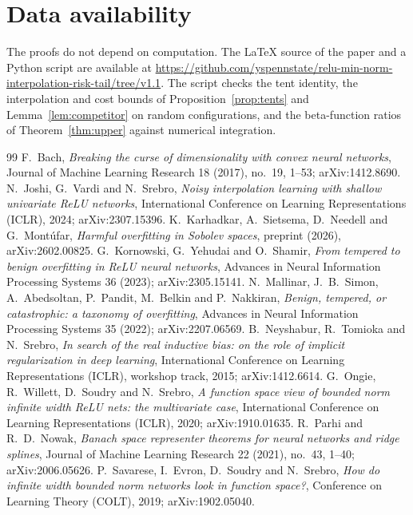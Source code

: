 \documentclass[11pt]{amsart}
\theoremstyle{remark}
\numberwithin{equation}{section}
\begin{document}
\section*{Data availability}
The proofs do not depend on computation. The \LaTeX{} source of the paper and a Python script are available at \url{https://github.com/yspennstate/relu-min-norm-interpolation-risk-tail/tree/v1.1}. The script checks the tent identity, the interpolation and cost bounds of Proposition~\ref{prop:tents} and Lemma~\ref{lem:competitor} on random configurations, and the beta-function ratios of Theorem~\ref{thm:upper} against numerical integration.

\appendix


\begin{thebibliography}{99}
 F.~Bach, \emph{Breaking the curse of dimensionality with convex neural networks}, Journal of Machine Learning Research 18 (2017), no.~19, 1--53; arXiv:1412.8690.
 N.~Joshi, G.~Vardi and N.~Srebro, \emph{Noisy interpolation learning with shallow univariate ReLU networks}, International Conference on Learning Representations (ICLR), 2024; arXiv:2307.15396.
 K.~Karhadkar, A.~Sietsema, D.~Needell and G.~Mont\'ufar, \emph{Harmful overfitting in Sobolev spaces}, preprint (2026), arXiv:2602.00825.
 G.~Kornowski, G.~Yehudai and O.~Shamir, \emph{From tempered to benign overfitting in ReLU neural networks}, Advances in Neural Information Processing Systems 36 (2023); arXiv:2305.15141.
 N.~Mallinar, J.~B.~Simon, A.~Abedsoltan, P.~Pandit, M.~Belkin and P.~Nakkiran, \emph{Benign, tempered, or catastrophic: a taxonomy of overfitting}, Advances in Neural Information Processing Systems 35 (2022); arXiv:2207.06569.
 B.~Neyshabur, R.~Tomioka and N.~Srebro, \emph{In search of the real inductive bias: on the role of implicit regularization in deep learning}, International Conference on Learning Representations (ICLR), workshop track, 2015; arXiv:1412.6614.
 G.~Ongie, R.~Willett, D.~Soudry and N.~Srebro, \emph{A function space view of bounded norm infinite width ReLU nets: the multivariate case}, International Conference on Learning Representations (ICLR), 2020; arXiv:1910.01635.
 R.~Parhi and R.~D.~Nowak, \emph{Banach space representer theorems for neural networks and ridge splines}, Journal of Machine Learning Research 22 (2021), no.~43, 1--40; arXiv:2006.05626.
 P.~Savarese, I.~Evron, D.~Soudry and N.~Srebro, \emph{How do infinite width bounded norm networks look in function space?}, Conference on Learning Theory (COLT), 2019; arXiv:1902.05040.

\end{thebibliography}
\end{document}
